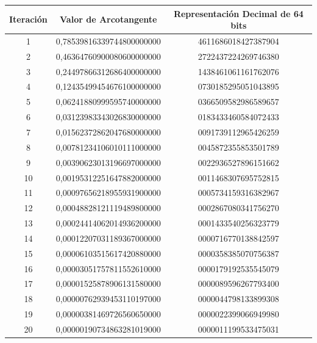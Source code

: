 \begin{itemize}
\begin{table}[hp!]
    \begin{center}
    	\footnotesize
        \begin{tabular}{|c|c|c|}
        \hline  
        \textbf{Iteración} & \textbf{Valor de Arcotangente} & \textbf{Representación Decimal de 64 bits} \\
        \hline
			1   &   0,78539816339744800000000   &   4611686018427387904   \\ \hline
			2   &   0,46364760900080600000000   &   2722437224269746380   \\ \hline
			3   &   0,24497866312686400000000   &   1438461061161762076   \\ \hline
			4   &   0,12435499454676100000000   &   0730185295051043895   \\ \hline
			5   &   0,06241880999595740000000   &   0366509582986589657   \\ \hline
			6   &   0,03123983343026830000000   &   0183433460584072433   \\ \hline
			7   &   0,01562372862047680000000   &   0091739112965426259   \\ \hline
			8   &   0,00781234106010111000000   &   0045872355853501789   \\ \hline
			9   &   0,00390623013196697000000   &   0022936527896151662   \\ \hline
			10  &   0,00195312251647882000000   &   0011468307695752815   \\ \hline
			11  &   0,00097656218955931900000   &   0005734159316382967   \\ \hline
			12  &   0,00048828121119489800000   &   0002867080341756270   \\ \hline
			13  &   0,00024414062014936200000   &   0001433540256323779   \\ \hline
			14  &   0,00012207031189367000000   &   0000716770138842597   \\ \hline
			15  &   0,00006103515617420880000   &   0000358385070756387   \\ \hline
			16  &   0,00003051757811552610000   &   0000179192535545079   \\ \hline
			17  &   0,00001525878906131580000   &   0000089596267793400   \\ \hline
			18  &   0,00000762939453110197000   &   0000044798133899308   \\ \hline
			19  &   0,00000381469726560650000   &   0000022399066949980   \\ \hline
			20  &   0,00000190734863281019000   &   0000011199533475031   \\ \hline

\end{tabular}
\end{center}
\end{table}
\end{itemize}
